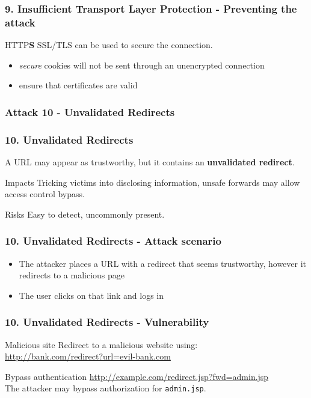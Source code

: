 \begin{frame}
\frametitle{9. Insufficient Transport Layer Protection - Preventing the attack}
\begin{block}{HTTP\textbf{S}}
SSL/TLS can be used to secure the connection.
\begin{itemize}
\item \emph{secure} cookies will not be sent through an unencrypted connection
\item ensure that certificates are valid
\end{itemize}
\end{block}
\end{frame}

\subsubsection{Attack 10 - Unvalidated Redirects}

\begin{frame}
\frametitle{10. Unvalidated Redirects}
A URL may appear as trustworthy, but it contains an \textbf{unvalidated
redirect}.
\begin{block}{Impacts}
Tricking victims into disclosing information, unsafe forwards may allow access
control bypass.
\end{block}
\begin{block}{Risks}
\alert{Easy to detect}, uncommonly present.
\end{block}
\end{frame}

\begin{frame}
\frametitle{10. Unvalidated Redirects - Attack scenario}
\begin{itemize}
\item The attacker places a URL with a redirect that seems trustworthy,
	however it redirects to a malicious page
\item The user clicks on that link and logs in
\end{itemize}
\end{frame}

\begin{frame}
\frametitle{10. Unvalidated Redirects - Vulnerability}
\begin{exampleblock}{Malicious site}
Redirect to a malicious website using:
\\ \url{http://bank.com/redirect?url=evil-bank.com}
\end{exampleblock}
\begin{exampleblock}{Bypass authentication}
\url{http://example.com/redirect.jsp?fwd=admin.jsp}
\\ The attacker may bypass authorization for \texttt{admin.jsp}.
\end{exampleblock}
\end{frame}

